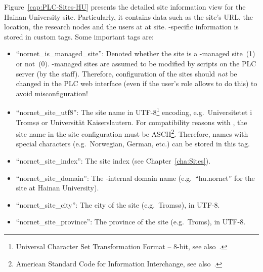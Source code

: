 Figure~\ref{cap:PLC-Sites-HU} presents the detailed site information view for the Hainan University site. Particularly, it contains data such as the site's URL, the location, the research nodes and the users at at site. -specific information is stored in custom tags. Some important tags are:
\begin{itemize}
 \item ``nornet\_is\_managed\_site'': Denoted whether the site is a -managed site~(1) or not~(0). -managed sites are assumed to be modified by scripts on the PLC server (by the  staff). Therefore, configuration of the sites should \emph{not} be changed in the PLC web interface (even if the user's role allows to do this) to avoid misconfiguration!

 \item ``nornet\_site\_utf8'': The site name in UTF-8\footnote{Universal Character Set Transformation Format -- 8-bit, see also~\cite{RFC3629}.} encoding, e.g.\ \foreignlanguage{norsk}{Universitetet i Tromsø} or \foreignlanguage{german}{Universität Kaiserslautern}. For compatibility reasons with , the site name in the site configuration must be ASCII\footnote{American Standard Code for Information Interchange, see also~\cite{Fis00}.}. Therefore, names with special characters (e.g.\ Norwegian, German, etc.) can be stored in this tag.
 
 \item ``nornet\_site\_index'': The  site index (see Chapter~\ref{cha:Sites}).
 
 \item ``nornet\_site\_domain'': The -internal domain name (e.g.\ ``hu.nornet'' for the site at Hainan University).
 
 \item ``nornet\_site\_city'': The city of the site (e.g.\ Tromsø), in UTF-8.
 
 \item ``nornet\_site\_province'': The province of the site (e.g.\ Troms), in UTF-8.
 

\end{itemize}
